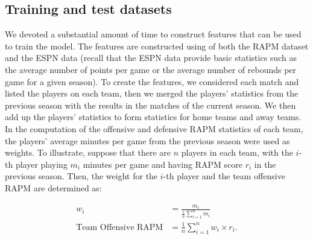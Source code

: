 \documentclass{article} %
\begin{document}
	\subsection{Training and test datasets}
	We devoted a substantial amount of time to construct features that can be used to train the model. The features are constructed using of both the RAPM dataset and the ESPN data (recall that the ESPN data provide basic statistics such as the average number of points per game or the average number of rebounds per game for a given season). To create the features, we considered each match and listed the players on each team, then we merged the players' statistics from the previous season with the results in the matches of the current season. We then add up  the players' statistics to form statistics for home teams and away teams. In the computation of the offensive and defensive RAPM statistics of each team, the players' average minutes per game from the previous season were used as weights. To illustrate, suppose that there are $n$ players in each team, with the $i$-th player  playing $m_i$ minutes per game and having RAPM score $r_i$ in the previous season. Then, the weight for the $i$-th player and the team offensive RAPM are determined as:

	\begin{align*}
		w_i &= \frac{m_i}{\frac{1}{n}\sum_{i=1}^{n} m_i} \\
		\text{Team Offensive RAPM} &= \frac{1}{n}\sum_{i=1}^{n} w_i \times r_i.
	\end{align*}
\end{document}
